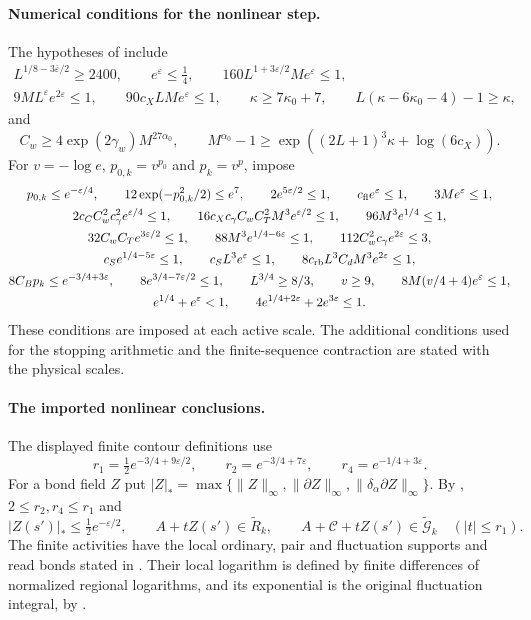 \paragraph{Numerical conditions for the nonlinear step.}
The hypotheses of \cite[Theorem A]{NonlinearStep} include
\[
 \begin{gathered}
 L^{1/8-3\bar\varepsilon/2}\ge2400,\qquad e^\varepsilon\le\tfrac14,\qquad
 160L^{1+3\varepsilon/2}Me^\varepsilon\le1,\\
 9ML^\varepsilon e^{2\varepsilon}\le1,\qquad
 90c_XLMe^\varepsilon\le1,\qquad
 \kappa\ge7\kappa_0+7,\qquad
 L(\kappa-6\kappa_0-4)-1\ge\kappa,
 \end{gathered}
\]
and
\[
 C_w\ge4\exp(2\gamma_w)M^{27\alpha_0},\qquad
 M^{\alpha_0}-1\ge\exp((2L+1)^3\kappa+\log(6c_X)).
\]
For \(v=-\log e\), \(p_{0,k}=v^{p_0}\) and \(p_k=v^p\), impose
\[
 \begin{gathered}
 p_{0,k}\le e^{-\varepsilon/4},\qquad
 12\exp(-p_{0,k}^2/2)\le e^7,\qquad 2e^{5\varepsilon/2}\le1,\qquad
 c_{\rm fl}e^\varepsilon\le1,\qquad 3Me^\varepsilon\le1,\\
 2c_CC_w^2c_\gamma^2e^{\varepsilon/4}\le1,\qquad
 16c_Xc_\gamma C_wC_T^2M^3e^{\varepsilon/2}\le1,\qquad
 96M^3e^{1/4}\le1,\\
 32C_wC_Te^{3\varepsilon/2}\le1,\qquad
 88M^3e^{1/4-6\varepsilon}\le1,\qquad
 112C_w^2c_\gamma e^{2\varepsilon}\le3,\\
 c_Se^{1/4-5\varepsilon}\le1,\qquad c_SL^3e^\varepsilon\le1,\qquad
 8c_{\rm rb}L^3C_dM^3e^{2\varepsilon}\le1,\\
 8C_Bp_k\le e^{-3/4+3\varepsilon},\qquad
 8e^{3/4-7\varepsilon/2}\le1,\qquad L^{3/4}\ge8/3,\qquad
 v\ge9,\qquad 8M(v/4+4)e^\varepsilon\le1,\\
 e^{1/4}+e^\varepsilon<1,\qquad
 4e^{1/4+2\varepsilon}+2e^{3\varepsilon}\le1.
 \end{gathered}
\]
These conditions are imposed at each active scale. The additional
conditions used for the stopping arithmetic and the finite-sequence
contraction are stated with the physical scales.

\paragraph{The imported nonlinear conclusions.}
The displayed finite contour definitions use
\[
 r_1=\tfrac12e^{-3/4+9\varepsilon/2},\qquad
 r_2=e^{-3/4+7\varepsilon},\qquad r_4=e^{-1/4+3\varepsilon}.
\]
For a bond field $Z$ put
$|Z|_* =\max\{\|Z\|_\infty,\|\partial Z\|_\infty,
\|\delta_\alpha\partial Z\|_\infty\}$.
By \cite[Proposition 5.1]{NonlinearStep},
\(2\le r_2,r_4\le r_1\) and
\[
 |Z(s')|_*\le\tfrac12e^{-\varepsilon/2},\qquad
 A+tZ(s')\in\widetilde R_k,\qquad
 A+\mathscr C+tZ(s')\in\widetilde{\mathcal G}_k
       \quad(|t|\le r_1).
\]
The finite activities have the local ordinary, pair and fluctuation
supports and read bonds stated in
\cite[Proposition 5.3]{NonlinearStep}.
Their local logarithm is defined by finite differences of normalized
regional logarithms, and its exponential is the original fluctuation integral,
by \cite[Proposition 6.1]{NonlinearStep}.

